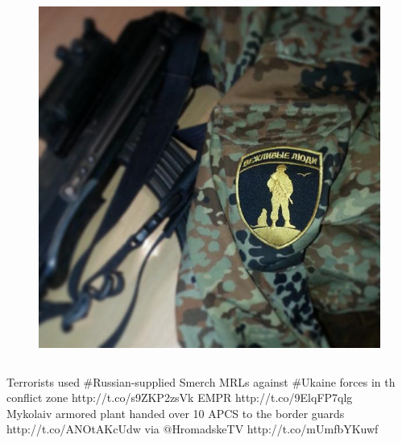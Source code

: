 \documentclass[12pt]{beamer}
\begin{document}
\begin{frame}
{\begin{columns}
\begin{column}{.5\textwidth}
\begin{figure}
					\includegraphics[width=\textwidth]{patch}
				\end{figure}
			\end{column}
		\end{columns}
	}
\end{frame}

\begin{frame}
	\begin{center}
		Terrorists used \#Russian-supplied Smerch MRLs against \#Ukaine forces in th conflict zone http://t.co/s9ZKP2zsVk EMPR http://t.co/9ElqFP7qlg
		\\[0.7cm]
		Mykolaiv armored plant handed over 10 APCS  to the border guards  http://t.co/ANOtAKcUdw via $@$HromadskeTV http://t.co/mUmfbYKuwf
	\end{center}
\end{frame}
\end{document}
